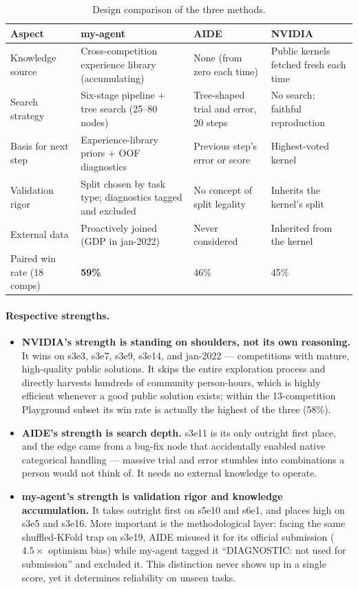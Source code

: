 \documentclass[11pt,a4paper]{article}
\begin{document}
\begin{table}[htbp]
\centering\footnotesize
\setlength{\tabcolsep}{4pt}
\caption{Design comparison of the three methods.}
\label{tab:threeway}
\begin{tabular}{@{}L{3.2cm}L{4.2cm}L{3.4cm}L{3.6cm}@{}}
\toprule
\textbf{Aspect} & \textbf{my-agent} & \textbf{AIDE} & \textbf{NVIDIA} \\
\midrule
Knowledge source & Cross-competition experience library (accumulating) & None (from zero each time) & Public kernels fetched fresh each time \\
Search strategy & Six-stage pipeline + tree search (25--80 nodes) & Tree-shaped trial and error, 20 steps & No search; faithful reproduction \\
Basis for next step & Experience-library priors + OOF diagnostics & Previous step's error or score & Highest-voted kernel \\
Validation rigor & Split chosen by task type; diagnostics tagged and excluded & No concept of split legality & Inherits the kernel's split \\
External data & Proactively joined (GDP in jan-2022) & Never considered & Inherited from the kernel \\
Paired win rate (18 comps) & \textbf{59\%} & 46\% & 45\% \\
\bottomrule
\end{tabular}
\end{table}

\paragraph{Respective strengths.}
\begin{itemize}[leftmargin=*]
\item \textbf{NVIDIA's strength is standing on shoulders, not its own reasoning.} It wins on s3e3, s3e7, s3e9, s3e14, and jan-2022 --- competitions with mature, high-quality public solutions. It skips the entire exploration process and directly harvests hundreds of community person-hours, which is highly efficient whenever a good public solution exists; within the 13-competition Playground subset its win rate is actually the highest of the three (58\%).
\item \textbf{AIDE's strength is search depth.} s3e11 is its only outright first place, and the edge came from a bug-fix node that accidentally enabled native categorical handling --- massive trial and error stumbles into combinations a person would not think of. It needs no external knowledge to operate.
\item \textbf{my-agent's strength is validation rigor and knowledge accumulation.} It takes outright first on s5e10 and s6e1, and places high on s3e5 and s3e16. More important is the methodological layer: facing the same shuffled-KFold trap on s3e19, AIDE misused it for its official submission ($4.5\times$ optimism bias) while my-agent tagged it ``DIAGNOSTIC: not used for submission'' and excluded it. This distinction never shows up in a single score, yet it determines reliability on unseen tasks.
\end{itemize}
\end{document}
